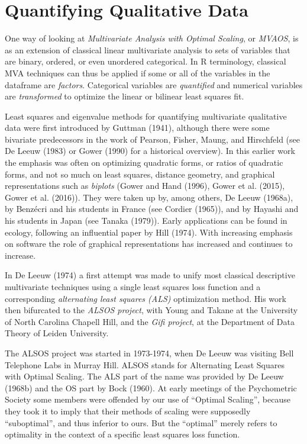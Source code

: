 \documentclass[
  12pt,
  letterpaper,
  DIV=11,
  numbers=noendperiod]{scrreprt}
\begin{document}
\section{Quantifying Qualitative
Data}\label{quantifying-qualitative-data}

One way of looking at \emph{Multivariate Analysis with Optimal Scaling},
or \emph{MVAOS}, is as an extension of classical linear multivariate
analysis to sets of variables that are binary, ordered, or even
unordered categorical. In R terminology, classical MVA techniques can
thus be applied if some or all of the variables in the dataframe are
\emph{factors}. Categorical variables are \emph{quantified} and
numerical variables are \emph{transformed} to optimize the linear or
bilinear least squares fit.

Least squares and eigenvalue methods for quantifying multivariate
qualitative data were first introduced by Guttman (1941), although there
were some bivariate predecessors in the work of Pearson, Fisher, Maung,
and Hirschfeld (see De Leeuw (1983) or Gower (1990) for a historical
overview). In this earlier work the emphasis was often on optimizing
quadratic forms, or ratios of quadratic forms, and not so much on least
squares, distance geometry, and graphical representations such as
\emph{biplots} (Gower and Hand (1996), Gower et al. (2015), Gower et al.
(2016)). They were taken up by, among others, De Leeuw (1968a), by
Benzécri and his students in France (see Cordier (1965)), and by Hayashi
and his students in Japan (see Tanaka (1979)). Early applications can be
found in ecology, following an influential paper by Hill (1974). With
increasing emphasis on software the role of graphical representations
has increased and continues to increase.

In De Leeuw (1974) a first attempt was made to unify most classical
descriptive multivariate techniques using a single least squares loss
function and a corresponding \emph{alternating least squares (ALS)}
optimization method. His work then bifurcated to the \emph{ALSOS
project}, with Young and Takane at the University of North Carolina
Chapell Hill, and the \emph{Gifi project}, at the Department of Data
Theory of Leiden University.

The ALSOS project was started in 1973-1974, when De Leeuw was visiting
Bell Telephone Labs in Murray Hill. ALSOS stands for Alternating Least
Squares with Optimal Scaling. The ALS part of the name was provided by
De Leeuw (1968b) and the OS part by Bock (1960). At early meetings of
the Psychometric Society some members were offended by our use of
``Optimal Scaling'', because they took it to imply that their methods of
scaling were supposedly ``suboptimal'', and thus inferior to ours. But
the ``optimal'' merely refers to optimality in the context of a specific
least squares loss function.
\end{document}
